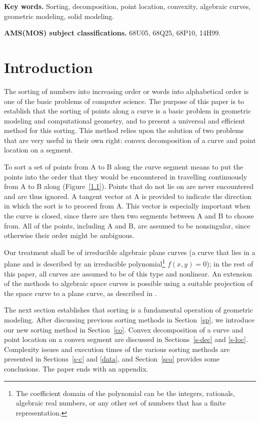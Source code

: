 {\bf Key words.} Sorting, decomposition, point location, convexity, algebraic curves,
geometric modeling, solid modeling.

{\bf AMS(MOS) subject classifications.} 68U05, 68Q25, 68P10, 14H99.

\section{Introduction}
%
The sorting of numbers into increasing order or words 
into alphabetical order is one of the basic problems of computer science.  
The purpose of this paper is to establish that the sorting of points
along a curve is a basic problem in geometric modeling and computational geometry,
and to present a universal and efficient method for this sorting.
This method relies upon the solution of two problems that are very useful in their
own right: convex decomposition of a curve and point location on a segment.

To sort a set of points from A to B along the curve segment  means to
put the points into the order that they would be encountered in travelling
continuously from A to B along  (Figure~\ref{1.1}).
Points that do not lie on  are never encountered and are thus ignored.
A tangent vector at A is provided to indicate the direction in which the sort is to
proceed from A. 
This vector is especially important when the curve is closed, since
there are then two segments between A and B to choose from.
All of the points, including A and B, are assumed to be nonsingular,
since otherwise their order might be ambiguous.
%

Our treatment shall be of irreducible algebraic plane curves (a curve that 
lies in a plane and is described by an irreducible polynomial\footnote{The coefficient
	domain of the polynomial can be the integers, rationals, algebraic real numbers,
	or any other set of numbers that has a finite representation.}
$f(x,y)=0$); 
in the rest of this paper, all curves are assumed to be of this type and nonlinear.
An extension of the methods to algebraic space curves is possible using 
a suitable projection of the space curve to a plane curve, as described in \cite{jj}.

The next section establishes that sorting is a fundamental operation of 
geometric modeling.
After discussing previous sorting methods in
Section~\ref{sp},
we introduce our new sorting method in
Section~\ref{co}.
Convex decomposition of a curve
and point location on a convex segment 
are discussed in Sections~\ref{s-dec} 
and \ref{s-loc}.
Complexity issues and execution times of the
various sorting methods are presented in Sections~\ref{s-c} and 
\ref{data}, and Section~\ref{sco} provides some conclusions.
The paper ends with an appendix.


